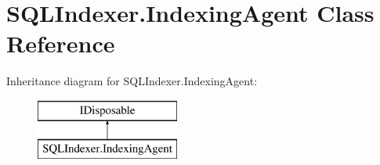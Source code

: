 \hypertarget{class_s_q_l_indexer_1_1_indexing_agent}{\section{S\-Q\-L\-Indexer.\-Indexing\-Agent Class Reference}
\label{class_s_q_l_indexer_1_1_indexing_agent}
}
Inheritance diagram for S\-Q\-L\-Indexer.\-Indexing\-Agent\-:\begin{figure}[H]
\begin{center}
\leavevmode
\includegraphics[height=2.000000cm]{class_s_q_l_indexer_1_1_indexing_agent}
\end{center}
\end{figure}
